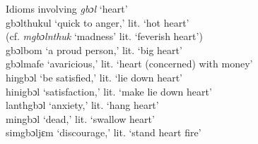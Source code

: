 \ea%
    \label{ex:249} Idioms involving \textit{gbɔl} ‘heart'\\
\vspace{6pt}
gbɔlthukul \tab ‘quick to anger,' lit. ‘hot heart'\\
\tab (cf. \textit{mgbɔlnthuk} ‘madness' lit. ‘feverish heart')\\
gbɔlbom \tab ‘a proud person,' lit. ‘big heart'\\
gbɔlmafe \tab ‘avaricious,' lit. ‘heart (concerned) with money'\\
hiŋgbɔl \tab ‘be satisfied,' lit. ‘lie down heart'\\
hinigbɔl \tab ‘satisfaction,'  lit. ‘make lie down heart'\\
lanthgbɔl \tab ‘anxiety,'  lit. ‘hang heart'\\
mingbɔl \tab ‘dead,' lit. ‘swallow heart'\\
simgbɔljɛm \tab ‘discourage,' lit. ‘stand heart fire'
\z
